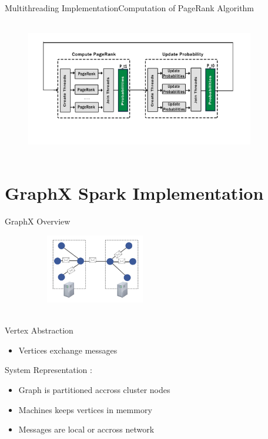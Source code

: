 \documentclass{beamer}
\begin{document}
\begin{frame}{Multithreading Implementation}{Computation of PageRank Algorithm}
    \begin{figure}
        \includegraphics[width=10cm, height=6cm]{implementation2.png}
    \end{figure}
\end{frame}

\section{GraphX Spark Implementation}
\begin{frame}{GraphX Overview}
    \begin{figure}
        \includegraphics[width=6cm, height=3cm]{spinner1.jpg}
    \end{figure}
    \\Vertex Abstraction
    \begin{itemize}
        \item{Vertices exchange messages}
    \end{itemize}
    System Representation :
    \begin{itemize}
        \item{Graph is partitioned accross cluster nodes}
        \item{Machines keeps vertices in memmory}
        \item{Messages are local or accross network}
    \end{itemize}
\end{frame}
\end{document}
